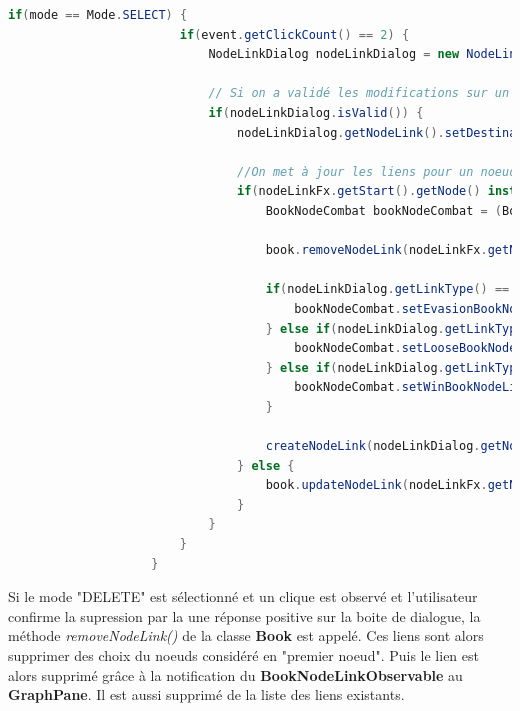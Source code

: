 				\begin{lstlisting}[gobble=20, language=java, caption=Classe NodeLinkFxListener avec le mode SELECT]
					if(mode == Mode.SELECT) {
						if(event.getClickCount() == 2) {
							NodeLinkDialog nodeLinkDialog = new NodeLinkDialog(nodeLinkFx.getNodeLink(), nodeLinkFx.getStart().getNode(), book);

							// Si on a validé les modifications sur un lien
							if(nodeLinkDialog.isValid()) {
								nodeLinkDialog.getNodeLink().setDestination(book.getNodeIndex(nodeLinkFx.getEnd().getNode()));

								//On met à jour les liens pour un noeud de combat
								if(nodeLinkFx.getStart().getNode() instanceof BookNodeCombat) {
									BookNodeCombat bookNodeCombat = (BookNodeCombat) nodeLinkFx.getStart().getNode();

									book.removeNodeLink(nodeLinkFx.getNodeLink());

									if(nodeLinkDialog.getLinkType() == NodeLinkDialog.EVASION) {
										bookNodeCombat.setEvasionBookNodeLink(nodeLinkDialog.getNodeLink());
									} else if(nodeLinkDialog.getLinkType() == NodeLinkDialog.PERDRE) {
										bookNodeCombat.setLooseBookNodeLink(nodeLinkDialog.getNodeLink());
									} else if(nodeLinkDialog.getLinkType() == NodeLinkDialog.GAGNE) {
										bookNodeCombat.setWinBookNodeLink(nodeLinkDialog.getNodeLink());
									}

									createNodeLink(nodeLinkDialog.getNodeLink(), nodeLinkFx.getStart(), nodeLinkFx.getEnd());
								} else {
									book.updateNodeLink(nodeLinkFx.getNodeLink(), nodeLinkDialog.getNodeLink());
								}
							}
						}
					}
				\end{lstlisting}

				Si le mode "DELETE" est sélectionné et un clique est observé et l'utilisateur confirme la supression par la une réponse positive sur la boite de dialogue, la méthode \textit{removeNodeLink()} de la classe \textbf{Book} est appelé. Ces liens sont alors supprimer des choix du noeuds considéré en "premier noeud". Puis le lien est alors supprimé grâce à la notification du \textbf{BookNodeLinkObservable} au \textbf{GraphPane}. Il est aussi supprimé de la liste des liens existants.


